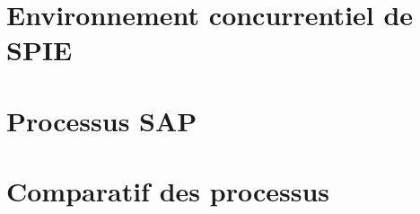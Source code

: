 

\newcommand{\mainTitle}{\'Etude préalable - SPIE}
\newcommand{\secondTitle}{Benchmarking}
\newcommand{\documentRef}{DEB-B/4401/1}
\newcommand{\auteurs}{
Lisa \textsc{Courant} \\
Estelle \textsc{Lepeigneux} \\
Pierre \textsc{Jarsaillon} \\
Hugues \textsc{Verlin} \\
}
\newcommand{\chefDeProjet}{Paul \textsc{Dautry}}
\newcommand{\responsableQualite}{Antoine \textsc{Chabert}}





\tableofcontents
\listoffigures
\newpage

\part{Environnement concurrentiel de SPIE}
\setcounter{section}{0}


\part{Processus SAP}
\setcounter{section}{0}


\part{Comparatif des processus}
\setcounter{section}{0}




